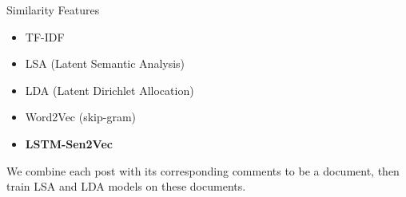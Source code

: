 \documentclass[aspectratio=169]{beamer} %
\begin{document}
    {
    
    }

    \begin{frame}{Similarity Features}
      \begin{itemize}
        \item TF-IDF
        \item LSA (Latent Semantic Analysis)
        \item LDA (Latent Dirichlet Allocation)
        \item Word2Vec (skip-gram)
        \item \textbf{LSTM-Sen2Vec }
      \end{itemize}
      We combine each post with its corresponding comments to be a document, then train LSA and LDA models on these documents.
    \end{frame}
\end{document}
